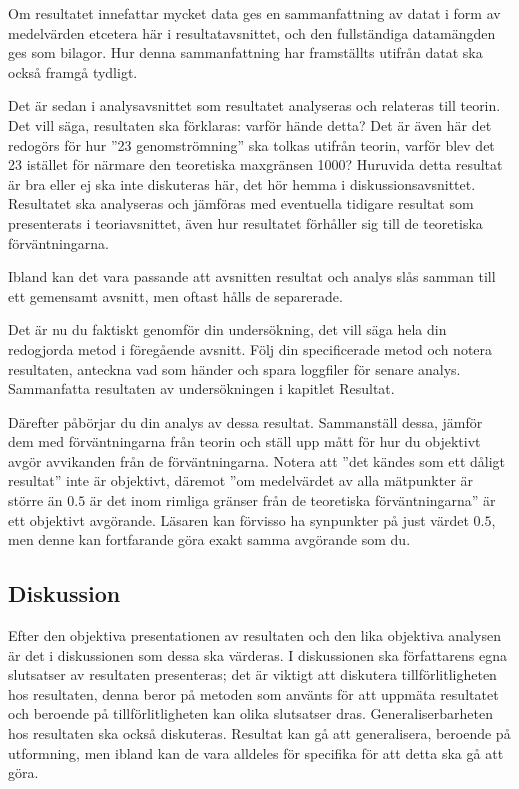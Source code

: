 \documentclass[a4paper]{miunasgn}
\begin{document}
Om resultatet innefattar mycket data ges en sammanfattning av datat i form av 
medelvärden etcetera här i resultatavsnittet, och den fullständiga datamängden 
ges som bilagor.
Hur denna sammanfattning har framställts utifrån datat ska också framgå 
tydligt.

Det är sedan i analysavsnittet som resultatet analyseras och relateras till 
teorin.
Det vill säga, resultaten ska förklaras: varför hände detta?
Det är även här det redogörs för hur ''\unit{23}{\mega\bit\per\second} 
genomströmning'' ska tolkas utifrån teorin, varför blev det 
\unit{23}{\mega\bit\per\second} istället för närmare den teoretiska maxgränsen 
\unit{1000}{\mebi\bit\per\second}?
Huruvida detta resultat är bra eller ej ska inte diskuteras här, det hör hemma 
i diskussionsavsnittet.
Resultatet ska analyseras och jämföras med eventuella tidigare resultat som 
presenterats i teoriavsnittet, även hur resultatet förhåller sig till de 
teoretiska förväntningarna.

Ibland kan det vara passande att avsnitten resultat och analys slås samman till 
ett gemensamt avsnitt, men oftast hålls de separerade.

Det är nu du faktiskt genomför din undersökning, det vill säga hela din 
redogjorda metod i föregående avsnitt.
Följ din specificerade metod och notera resultaten, anteckna vad som händer och 
spara loggfiler för senare analys.
Sammanfatta resultaten av undersökningen i kapitlet Resultat.

Därefter påbörjar du din analys av dessa resultat.
Sammanställ dessa, jämför dem med förväntningarna från teorin och ställ upp 
mått för hur du objektivt avgör avvikanden från de förväntningarna.
Notera att ''det kändes som ett dåligt resultat'' inte är objektivt, däremot 
''om medelvärdet av alla mätpunkter är större än \(0.5\) är det inom rimliga 
gränser från de teoretiska förväntningarna'' är ett objektivt avgörande.
Läsaren kan förvisso ha synpunkter på just värdet \(0.5\), men denne kan 
fortfarande göra exakt samma avgörande som du.

\subsection{Diskussion}

Efter den objektiva presentationen av resultaten och den lika objektiva 
analysen är det i diskussionen som dessa ska värderas.
I diskussionen ska författarens egna slutsatser av resultaten presenteras; det 
är viktigt att diskutera tillförlitligheten hos resultaten, denna beror på 
metoden som använts för att uppmäta resultatet och beroende på 
tillförlitligheten kan olika slutsatser dras.
Generaliserbarheten hos resultaten ska också diskuteras.
Resultat kan gå att generalisera, beroende på utformning, men ibland kan de 
vara alldeles för specifika för att detta ska gå att göra.
\end{document}
